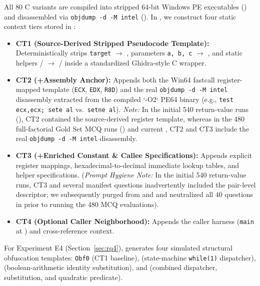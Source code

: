 \documentclass[conference]{IEEEtran}
\begin{document}
All 80 C variants are compiled into stripped 64-bit Windows PE executables () and disassembled via \texttt{objdump -d -M intel} (). In , we construct four static context tiers stored in :
\begin{itemize}
    \item \textbf{CT1 (Source-Derived Stripped Pseudocode Template):} Deterministically strips \texttt{target} $\rightarrow$ , parameters \texttt{a, b, c} $\rightarrow$ , and static helpers / $\rightarrow$ / inside a standardized Ghidra-style C wrapper.
    \item \textbf{CT2 (+Assembly Anchor):} Appends both the Win64 fastcall register-mapped template (\texttt{ECX}, \texttt{EDX}, \texttt{R8D}) and the real \texttt{objdump -d -M intel} disassembly extracted from the compiled `-O2` PE64 binary (e.g., \texttt{test ecx,ecx; sete al} vs.\ \texttt{setne al}). \textit{Note:} In the initial 540 return-value runs (), CT2 contained the source-derived register template, whereas in the 480 full-factorial Gold Set MCQ runs () and current , CT2 and CT3 include the real \texttt{objdump -d -M intel} disassembly.
    \item \textbf{CT3 (+Enriched Constant \& Callee Specifications):} Appends explicit register mappings, hexadecimal-to-decimal immediate lookup tables, and helper specifications. (\textit{Prompt Hygiene Note:} In the initial 540 return-value runs, CT3 and several manifest questions inadvertently included the pair-level  descriptor; we subsequently purged  from  and  and neutralized all 40 questions in  prior to running the 480 MCQ evaluations).
    \item \textbf{CT4 (Optional Caller Neighborhood):} Appends the caller harness (\texttt{main} at ) and cross-reference context.
\end{itemize}
For Experiment E4 (Section~\ref{sec:rq4}),  generates four simulated structural obfuscation templates: \texttt{Obf0} (CT1 baseline),  (state-machine \texttt{while(1)} dispatcher),  (boolean-arithmetic identity substitution), and  (combined dispatcher, substitution, and quadratic predicate).
\end{document}
